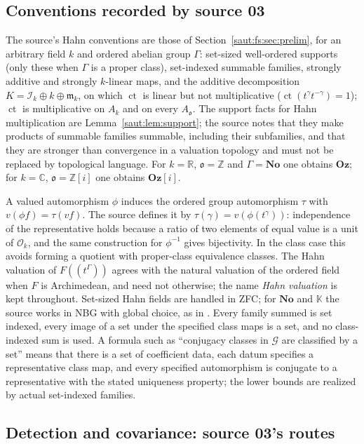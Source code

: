 \documentclass[11pt]{article}
\theoremstyle{definition}
\theoremstyle{remark}
\newcommand{\No}{\mathbf{No}}
\newcommand{\R}{\mathbb R}
\newcommand{\C}{\mathbb C}
\newcommand{\Z}{\mathbb Z}
\newcommand{\K}{\mathbb K}
\newcommand{\OO}{\mathcal O}
\newcommand{\mm}{\mathfrak m}
\newcommand{\Oz}{\mathbf{Oz}}
\newcommand{\ct}{\operatorname{ct}}
\newcommand{\Ineg}{\mathcal I}
\numberwithin{equation}{section}
\begin{document}
\subsection{Conventions recorded by source 03}

The source's Hahn conventions are those of Section~\ref{saut:fs:sec:prelim}, for an
arbitrary field $k$ and ordered abelian group $\Gamma$: set-sized well-ordered
supports (only these when $\Gamma$ is a proper class), set-indexed summable families,
strongly additive and strongly $k$-linear maps, and the additive decomposition
$K=\Ineg_k\oplus k\oplus\mm_k$, on which $\ct$ is linear but not multiplicative
($\ct(t^\gamma t^{-\gamma})=1$); $\ct$ is multiplicative on $A_k$ and on every
$A_{\mathfrak o}$. The support facts for Hahn multiplication are
Lemma~\ref{saut:lem:support}; the source notes that they make products of summable
families summable, including their subfamilies, and that they are stronger than
convergence in a valuation topology and must not be replaced by topological
language. For $k=\R$, $\mathfrak o=\Z$ and $\Gamma=\No$ one obtains $\Oz$; for $k=\C$,
$\mathfrak o=\Z[i]$ one obtains $\Oz[i]$.

A valued automorphism $\phi$ induces the ordered group automorphism $\tau$ with
$v(\phi f)=\tau(vf)$. The source defines it by $\tau(\gamma)=v(\phi(t^\gamma))$:
independence of the representative holds because a ratio of two elements of equal
value is a unit of $\OO_k$, and the same construction for $\phi^{-1}$ gives
bijectivity. In the class case this avoids forming a quotient with proper-class
equivalence classes. The Hahn valuation of $F((t^\Gamma))$ agrees with the natural
valuation of the ordered field when $F$ is Archimedean, and need not otherwise; the
name \emph{Hahn valuation} is kept throughout. Set-sized Hahn fields are handled in
ZFC; for $\No$ and $\K$ the source works in NBG with global choice, as in
\cite{KKS}. Every family summed is set indexed, every image of a set under the
specified class maps is a set, and no class-indexed sum is used. A formula such as
``conjugacy classes in $\mathcal G$ are classified by a set'' means that there is a
set of coefficient data, each datum specifies a representative class map, and every
specified automorphism is conjugate to a representative with the stated uniqueness
property; the lower bounds are realized by actual set-indexed families.

\subsection{Detection and covariance: source 03's routes}\label{saut:gr:sec:detect}
\end{document}
